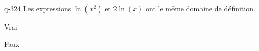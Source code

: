 \begin{truefalse}{q-324}
Les expressions $\ln(x^2)$ et $2\ln(x)$ ont le même domaine de définition.
\item Vrai
\item* Faux
\end{truefalse}

